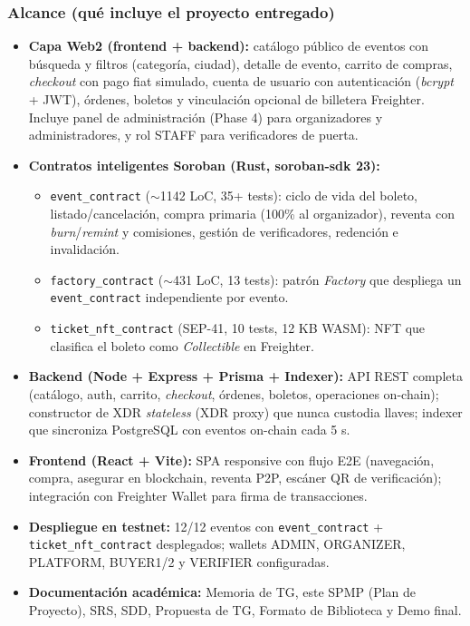 \documentclass[12pt,oneside]{report}
\begin{document}
      \subsubsection*{Alcance (qué incluye el proyecto entregado)}
      \begin{itemize}
        \item \textbf{Capa Web2 (frontend + backend):} catálogo público de eventos con búsqueda y filtros (categoría, ciudad), detalle de evento, carrito de compras, \textit{checkout} con pago fiat simulado, cuenta de usuario con autenticación (\textit{bcrypt} + JWT), órdenes, boletos y vinculación opcional de billetera Freighter. Incluye panel de administración (Phase 4) para organizadores y administradores, y rol STAFF para verificadores de puerta.
        \item \textbf{Contratos inteligentes Soroban (Rust, soroban-sdk 23):}
        \begin{itemize}
          \item \texttt{event\_contract} ($\sim$1142 LoC, 35+ tests): ciclo de vida del boleto, listado/cancelación, compra primaria (100\% al organizador), reventa con \textit{burn}/\textit{remint} y comisiones, gestión de verificadores, redención e invalidación.
          \item \texttt{factory\_contract} ($\sim$431 LoC, 13 tests): patrón \textit{Factory} que despliega un \texttt{event\_contract} independiente por evento.
          \item \texttt{ticket\_nft\_contract} (SEP-41, 10 tests, 12 KB WASM): NFT que clasifica el boleto como \textit{Collectible} en Freighter.
        \end{itemize}
        \item \textbf{Backend (Node + Express + Prisma + Indexer):} API REST completa (catálogo, auth, carrito, \textit{checkout}, órdenes, boletos, operaciones on-chain); constructor de XDR \textit{stateless} (XDR proxy) que nunca custodia llaves; indexer que sincroniza PostgreSQL con eventos on-chain cada 5 s.
        \item \textbf{Frontend (React + Vite):} SPA responsive con flujo E2E (navegación, compra, asegurar en blockchain, reventa P2P, escáner QR de verificación); integración con Freighter Wallet para firma de transacciones.
        \item \textbf{Despliegue en testnet:} 12/12 eventos con \texttt{event\_contract} + \texttt{ticket\_nft\_contract} desplegados; wallets ADMIN, ORGANIZER, PLATFORM, BUYER1/2 y VERIFIER configuradas.
        \item \textbf{Documentación académica:} Memoria de TG, este SPMP (Plan de Proyecto), SRS, SDD, Propuesta de TG, Formato de Biblioteca y Demo final.
      \end{itemize}
\end{document}
